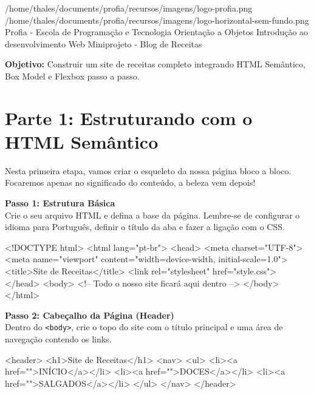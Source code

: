 \documentclass[12pt,a4paper]{article}
\begin{document}
\cabecalhoRoteiro
    {/home/thales/documents/profia/recursos/imagens/logo-profia.png} %
    {/home/thales/documents/profia/recursos/imagens/logo-horizontal-sem-fundo.png} %
    {Profia - Escola de Programação e Tecnologia}
    {Orientação a Objetos}
    {Introdução ao desenvolvimento Web}
    {Miniprojeto - Blog de Receitas}

\noindent\textbf{Objetivo:} Construir um site de receitas completo integrando HTML Semântico, Box Model e Flexbox passo a passo.

\vspace{0.5cm}

\section*{Parte 1: Estruturando com o HTML Semântico}
Nesta primeira etapa, vamos criar o esqueleto da nossa página bloco a bloco. Focaremos apenas no significado do conteúdo, a beleza vem depois!

\vspace{0.25cm}
\noindent\textbf{Passo 1: Estrutura Básica}\\
Crie o seu arquivo HTML e defina a base da página. Lembre-se de configurar o idioma para Português, definir o título da aba e fazer a ligação com o CSS.

\begin{codehtml}
<!DOCTYPE html>
<html lang="pt-br">
    <head>
        <meta charset="UTF-8">
        <meta name="viewport" content="width=device-width, initial-scale=1.0">
        <title>Site de Receitas</title>
        <link rel="stylesheet" href="style.css">
    </head>
    <body>
        <!-- Todo o nosso site ficará aqui dentro -->
    </body>
</html>
\end{codehtml}

\noindent\textbf{Passo 2: Cabeçalho da Página (Header)}\\
Dentro do \verb|<body>|, crie o topo do site com o título principal e uma área de navegação contendo os links.

\begin{codehtml}
        <header>
            <h1>Site de Receitas</h1>
            <nav>
                <ul>
                    <li><a href="">INÍCIO</a></li>
                    <li><a href="">DOCES</a></li>
                    <li><a href="">SALGADOS</a></li>
                </ul>
            </nav>
        </header>
\end{codehtml}
\end{document}
